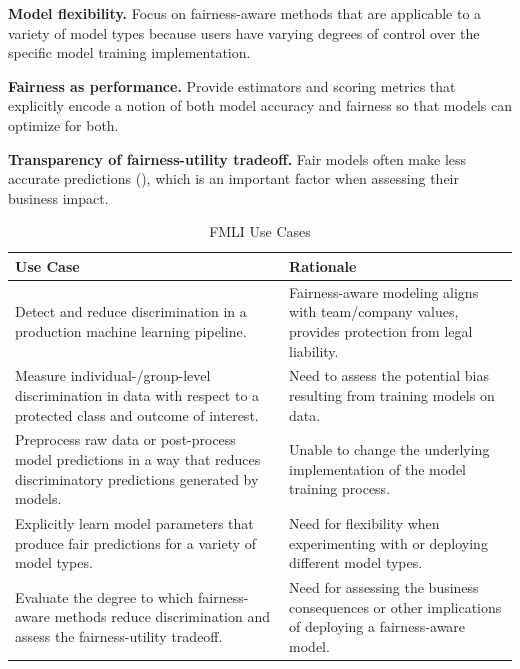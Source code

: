 \documentclass[man,natbib]{apa6}
\begin{document}
\begin{hangparas}{.15in}{1}
  \textbf{Model flexibility.} Focus on fairness-aware methods that are applicable
    to a variety of model types because users have varying degrees of control
    over the specific model training implementation.
\end{hangparas}
\begin{hangparas}{.15in}{1}
  \textbf{Fairness as performance.} Provide estimators and scoring metrics that
    explicitly encode a notion of both model accuracy and fairness so that models
    can optimize for both.
\end{hangparas}
\begin{hangparas}{.15in}{1}
\textbf{Transparency of fairness-utility tradeoff.} Fair models often make less
  accurate predictions (\citealp{kamishima2012fairness, zliobaite2015survey}),
  which is an important factor when assessing their business impact.
\end{hangparas}

\begin{table}
  \caption{FMLI Use Cases}
  \renewcommand{\arraystretch}{1.75}
  \small\noindent\begin{tabularx}{\linewidth}{X X}
    \textbf{Use Case} & \textbf{Rationale} \\
    \hline
    Detect and reduce discrimination in a production machine learning pipeline.
      & Fairness-aware modeling aligns with team/company values,
        provides protection from legal liability. \\
    Measure individual-/group-level discrimination in data with respect to a
    protected class and outcome of interest.
      & Need to assess the potential bias resulting from training models on
        data. \\
    Preprocess raw data or post-process model predictions in a way that reduces
    discriminatory predictions generated by models.
      & Unable to change the underlying implementation of the model training
        process. \\
    Explicitly learn model parameters that produce fair predictions for a variety
    of model types.
      & Need for flexibility when experimenting with or deploying different model
        types. \\
    Evaluate the degree to which fairness-aware methods reduce discrimination
    and assess the fairness-utility tradeoff.
      & Need for assessing the business consequences or other implications of
        deploying a fairness-aware model.
  \end{tabularx}
\end{table}
\end{document}
